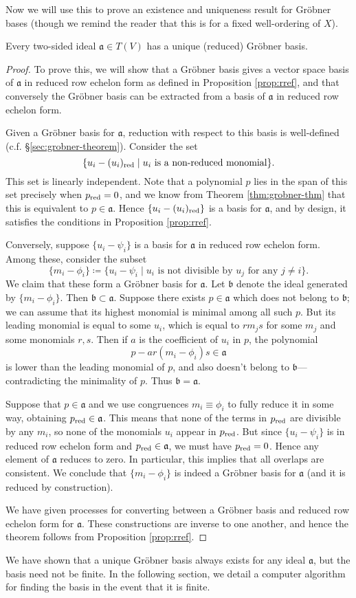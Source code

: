 Now we will use this to prove an existence and uniqueness result for Gr\"obner bases (though we remind the reader that this is for a fixed well-ordering of $X$).
\begin{thm}\label{thm:exist+unique}
	Every two-sided ideal $\mathfrak{a}\in T(V)$ has a unique (reduced) Gr\"obner basis.
\end{thm}
\begin{proof}
	To prove this, we will show that a Gr\"obner basis gives a vector space basis of $\mathfrak{a}$ in reduced row echelon form as defined in Proposition \ref{prop:rref}, and that conversely the Gr\"obner basis can be extracted from a basis of $\mathfrak{a}$ in reduced row echelon form.
	
	Given a Gr\"obner basis for $\mathfrak{a}$, reduction with respect to this basis is well-defined (c.f. \S\ref{sec:grobner-theorem}). Consider the set
	\[
		\{u_i - (u_i)_{\mathrm{red}} \mid u_i \text{ is a non-reduced monomial}\}.
	\]
	This set is linearly independent. Note that a polynomial $p$ lies in the span of this set precisely when $p_{\mathrm{red}} = 0$, and we know from Theorem \ref{thm:grobner-thm} that this is equivalent to $p \in \mathfrak{a}$. Hence $\{u_i - (u_i)_{\mathrm{red}}\}$ is a basis for $\mathfrak{a}$, and by design, it satisfies the conditions in Proposition \ref{prop:rref}.
	
	Conversely, suppose $\{u_i - \psi_i\}$ is a basis for $\mathfrak{a}$ in reduced row echelon form. Among these, consider the subset
	\[
		\{m_i - \phi_i\} \coloneqq \{u_i - \psi_i \mid u_i \text{ is not divisible by } u_j \text{ for any }j\neq i\}.
	\]
	We claim that these form a Gr\"obner basis for $\mathfrak{a}$. Let $\mathfrak{b}$ denote the ideal generated by $\{m_i -\phi_i\}$. Then $\mathfrak{b} \subset \mathfrak{a}$. Suppose there exists $p\in \mathfrak{a}$ which does not belong to $\mathfrak{b}$; we can assume that its highest monomial is minimal among all such $p$. But its leading monomial is equal to some $u_i$, which is equal to $rm_j s$ for some $m_j$ and some monomials $r,s$. Then if $a$ is the coefficient of $u_i$ in $p$, the polynomial
	\[
		p - ar(m_i -\phi_i)s \in \mathfrak{a}
	\]
	is lower than the leading monomial of $p$, and also doesn't belong to $\mathfrak{b}$---contradicting the minimality of $p$. Thus $\mathfrak{b} = \mathfrak{a}$.
	
	Suppose that $p\in \mathfrak{a}$ and we use congruences $m_i \equiv \phi_i$ to fully reduce it in some way, obtaining $p_{\mathrm{red}} \in \mathfrak{a}$. This means that none of the terms in $p_{\mathrm{red}}$ are divisible by any $m_i$, so none of the monomials $u_i$ appear in $p_{\mathrm{red}}$. But since $\{u_i - \psi_i\}$ is in reduced row echelon form and $p_{\mathrm{red}} \in \mathfrak{a}$, we must have $p_{\mathrm{red}} = 0$. Hence any element of $\mathfrak{a}$ reduces to zero. In particular, this implies that all overlaps are consistent. We conclude that $\{m_i - \phi_i\}$ is indeed a Gr\"obner basis for $\mathfrak{a}$ (and it is reduced by construction).
	
	We have given processes for converting between a Gr\"obner basis and reduced row echelon form for $\mathfrak{a}$. These constructions are inverse to one another, and hence the theorem follows from Proposition \ref{prop:rref}.
\end{proof}
We have shown that a unique Gr\"obner basis always exists for any ideal $\mathfrak{a}$, but the basis need not be finite. In the following section, we detail a computer algorithm for finding the basis in the event that it is finite.
